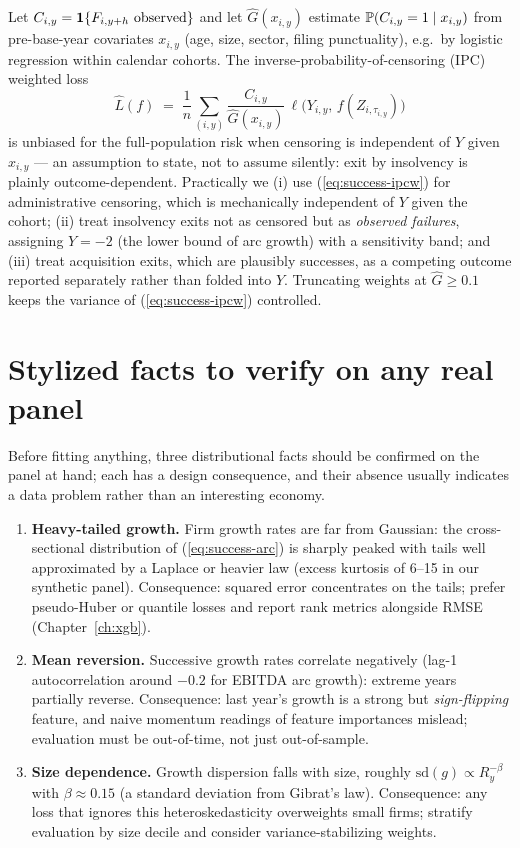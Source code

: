 Let $C_{i,y} = \mathbf{1}\{F_{i,y+h}~\text{observed}\}$ and let
$\hat G(x_{i,y})$ estimate $\mathbb{P}(C_{i,y}=1 \mid x_{i,y})$ from pre-base-year
covariates $x_{i,y}$ (age, size, sector, filing punctuality), e.g.\ by logistic
regression within calendar cohorts. The inverse-probability-of-censoring (IPC) weighted
loss
\begin{equation}
\label{eq:success-ipcw}
\hat{L}(f) \;=\; \frac{1}{n}\sum_{(i,y)} \frac{C_{i,y}}{\hat G(x_{i,y})}\,
\ell\big(Y_{i,y},\, f(Z_{i,\tau_{i,y}})\big)
\end{equation}
is unbiased for the full-population risk when censoring is independent of $Y$ given
$x_{i,y}$ --- an assumption to state, not to assume silently: exit by insolvency is
plainly outcome-dependent. Practically we (i) use (\ref{eq:success-ipcw}) for
administrative censoring, which is mechanically independent of $Y$ given the cohort;
(ii) treat insolvency exits not as censored but as \emph{observed failures}, assigning
$Y = -2$ (the lower bound of arc growth) with a sensitivity band; and (iii) treat
acquisition exits, which are plausibly successes, as a competing outcome reported
separately rather than folded into $Y$. Truncating weights at $\hat G \ge 0.1$ keeps
the variance of (\ref{eq:success-ipcw}) controlled.

\section{Stylized facts to verify on any real panel}
\label{sec:success-stylized}

Before fitting anything, three distributional facts should be confirmed on the panel at
hand; each has a design consequence, and their absence usually indicates a data problem
rather than an interesting economy.

\begin{enumerate}
\item \textbf{Heavy-tailed growth.} Firm growth rates are far from Gaussian: the
cross-sectional distribution of (\ref{eq:success-arc}) is sharply peaked with
tails well approximated by a Laplace or heavier law (excess kurtosis of 6--15 in our
synthetic panel). Consequence: squared error concentrates on the tails; prefer
pseudo-Huber or quantile losses and report rank metrics alongside RMSE
(Chapter~\ref{ch:xgb}).
\item \textbf{Mean reversion.} Successive growth rates correlate negatively
(lag-1 autocorrelation around $-0.2$ for EBITDA arc growth): extreme years partially
reverse. Consequence: last year's growth is a strong but \emph{sign-flipping} feature,
and naive momentum readings of feature importances mislead; evaluation must be
out-of-time, not just out-of-sample.
\item \textbf{Size dependence.} Growth dispersion falls with size, roughly
$\mathrm{sd}(g) \propto R_y^{-\beta}$ with $\beta \approx 0.15$ (a standard deviation
from Gibrat's law). Consequence: any loss that ignores this heteroskedasticity
overweights small firms; stratify evaluation by size decile and consider
variance-stabilizing weights.
\end{enumerate}

